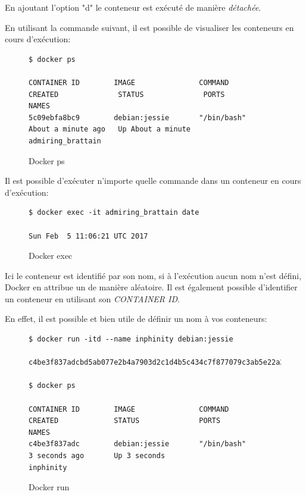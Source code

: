 En ajoutant l'option "d" le conteneur est exécuté de manière \emph{détachée}.

En utilisant la commande suivant, il est possible de visualiser les conteneurs en cours d'exécution:

\begin{figure}[H] 
\centering 
\begin{lstlisting}[frame=single]
$ docker ps

CONTAINER ID        IMAGE               COMMAND             CREATED              STATUS              PORTS               NAMES
5c09ebfa8bc9        debian:jessie       "/bin/bash"         About a minute ago   Up About a minute                       admiring_brattain
\end{lstlisting}
\caption[Docker ps]{Docker ps}
\label{fig:dockerPs} 
\end{figure}

Il est possible d'exécuter n’importe quelle commande dans un conteneur en cours d'exécution:

\begin{figure}[H] 
\centering 
\begin{lstlisting}[frame=single]
$ docker exec -it admiring_brattain date

Sun Feb  5 11:06:21 UTC 2017
\end{lstlisting}
\caption[Docker exec]{Docker exec}
\label{fig:dockerExec} 
\end{figure}

Ici le conteneur est identifié par son nom, si à l'exécution aucun nom n'est défini, Docker en attribue un de manière aléatoire. Il est également possible d'identifier un conteneur en utilisant son \emph{CONTAINER ID}.

En effet, il est possible et bien utile de définir un nom à vos conteneurs:

\begin{figure}[H] 
\centering 
\begin{lstlisting}[frame=single]
$ docker run -itd --name inphinity debian:jessie

c4be3f837adcbd5ab077e2b4a7903d2c1d4b5c434c7f877079c3ab5e22a2c555

$ docker ps

CONTAINER ID        IMAGE               COMMAND             CREATED             STATUS              PORTS               NAMES
c4be3f837adc        debian:jessie       "/bin/bash"         3 seconds ago       Up 3 seconds                            inphinity
\end{lstlisting}
\caption[Docker run]{Docker run}
\label{fig:dockerRun} 
\end{figure}

